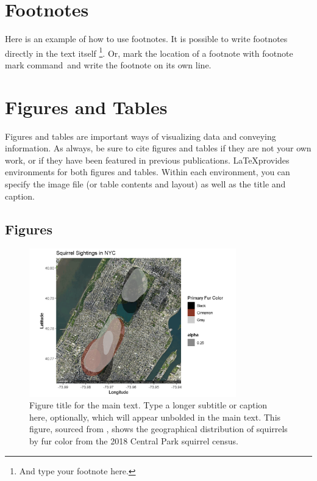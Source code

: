 \section{Footnotes}

Here is an example of how to use footnotes. It is possible to write footnotes directly in the text itself \footnote{And type your footnote here.}. Or, mark the location of a footnote with footnote mark command\footnotemark \, and write the footnote on its own line. 


\section{Figures and Tables}

Figures and tables are important ways of visualizing data and conveying information. As always, be sure to cite figures and tables if they are not your own work, or if they have been featured in previous publications. \LaTeX provides environments for both figures and tables. Within each environment, you can specify the image file (or table contents and layout) as well as the title and caption. 

\subsection{Figures}

\begin{figure}
\begin{center}
	\includegraphics[width=0.8\textwidth]{figures/SquirrelData.png} %
	\caption[Figure title for the List of Figures]{ 
    Figure title for the main text. %
    \textmd{Type a longer subtitle or caption here, optionally, which will appear unbolded in the main text. This figure, sourced from \cite{squirreldata}, shows the geographical distribution of squirrels by fur color from the 2018 Central Park squirrel census.}
    }
    \label{fig:figurelabel} %
    \end{center}
\end{figure}

